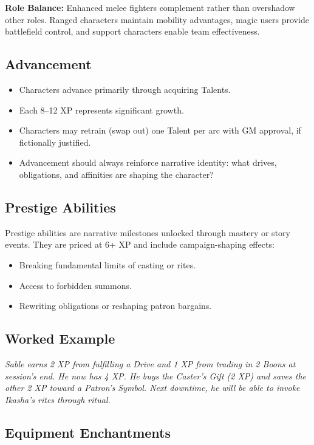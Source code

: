 \textbf{Role Balance:} Enhanced melee fighters complement rather than overshadow other roles. Ranged characters maintain mobility advantages, magic users provide battlefield control, and support characters enable team effectiveness.

\subsection{Advancement}
\begin{itemize}
  \item Characters advance primarily through acquiring Talents.
  \item Each 8–12 XP represents significant growth.
  \item Characters may retrain (swap out) one Talent per arc with GM approval, if fictionally justified.
  \item Advancement should always reinforce narrative identity: what drives, obligations, and affinities are shaping the character?
\end{itemize}

\subsection{Prestige Abilities}
Prestige abilities are narrative milestones unlocked through mastery or story events. They are priced at 6+ XP and include campaign-shaping effects:
\begin{itemize}
  \item Breaking fundamental limits of casting or rites.
  \item Access to forbidden summons.
  \item Rewriting obligations or reshaping patron bargains.
\end{itemize}

\subsection{Worked Example}
\emph{Sable earns 2 XP from fulfilling a Drive and 1 XP from trading in 2 Boons at session’s end. He now has 4 XP. He buys the Caster’s Gift (2 XP) and saves the other 2 XP toward a Patron’s Symbol. Next downtime, he will be able to invoke Ikasha’s rites through ritual.}

\subsection{Equipment Enchantments}

